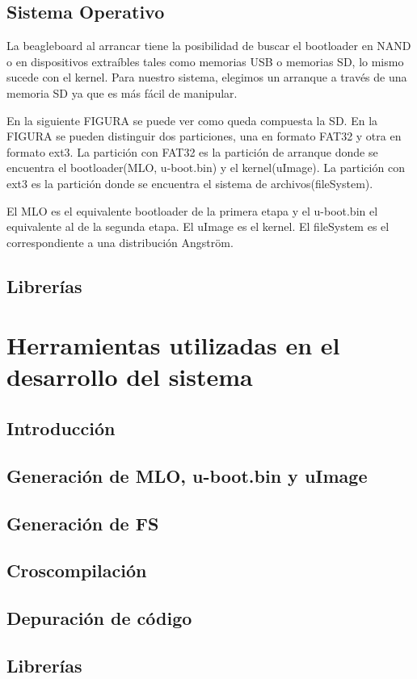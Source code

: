 \subsection{Sistema Operativo}
La beagleboard al arrancar tiene la posibilidad de buscar el bootloader en NAND o en dispositivos extraíbles tales como memorias USB o memorias SD, lo mismo sucede con el kernel. Para nuestro sistema, elegimos un arranque a través de una memoria SD ya que es más fácil de manipular.

En la siguiente FIGURA se puede ver como queda compuesta la SD.
En la FIGURA se pueden distinguir dos particiones, una en formato FAT32 y otra en formato ext3.
La partición con FAT32 es la partición de arranque donde se encuentra el bootloader(MLO, u-boot.bin) y el kernel(uImage).
La partición con ext3 es la partición donde se encuentra el sistema de archivos(fileSystem).

El MLO es el equivalente bootloader de la primera etapa y el u-boot.bin el equivalente al de la segunda etapa.
El uImage es el kernel.
El fileSystem es el correspondiente a una distribución Angström.
\subsection{Librerías}
\section{Herramientas utilizadas en el desarrollo del sistema}
\subsection{Introducción}
\subsection{Generación de MLO, u-boot.bin y uImage}
\subsection{Generación de FS}
\subsection{Croscompilación}
\subsection{Depuración de código}
\subsection{Librerías}
